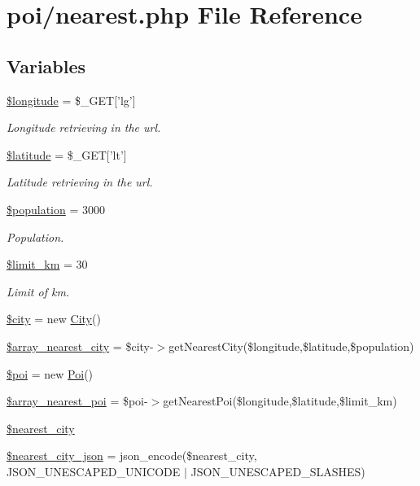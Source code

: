 \hypertarget{poi_2nearest_8php}{\section{poi/nearest.php File Reference}
\label{poi_2nearest_8php}
}
\subsection*{Variables}
\begin{DoxyCompactItemize}
\item 
\hyperlink{poi_2nearest_8php_aabb5b5c018fed3789fce382e336cfa47}{\$longitude} = \$\-\_\-\-G\-E\-T\mbox{[}'lg'\mbox{]}
\begin{DoxyCompactList}\small\item\em Longitude retrieving in the url. \end{DoxyCompactList}\item 
\hyperlink{poi_2nearest_8php_a5635a7326fb0b96e184ca6f5baa13e94}{\$latitude} = \$\-\_\-\-G\-E\-T\mbox{[}'lt'\mbox{]}
\begin{DoxyCompactList}\small\item\em Latitude retrieving in the url. \end{DoxyCompactList}\item 
\hyperlink{poi_2nearest_8php_afc1939ed7d0e8629546e2bc27b02dbc1}{\$population} = 3000
\begin{DoxyCompactList}\small\item\em Population. \end{DoxyCompactList}\item 
\hyperlink{poi_2nearest_8php_a00de150c5780d1d74512d2f6c6477d22}{\$limit\-\_\-km} = 30
\begin{DoxyCompactList}\small\item\em Limit of km. \end{DoxyCompactList}\item 
\hyperlink{poi_2nearest_8php_a5b9ddd3e3a69d8901270064346bdef49}{\$city} = new \hyperlink{class_city}{City}()
\item 
\hyperlink{poi_2nearest_8php_ad20bfb1568497d36431fbd90847417cc}{\$array\-\_\-nearest\-\_\-city} = \$city-\/$>$get\-Nearest\-City(\$longitude,\$latitude,\$population)
\item 
\hyperlink{poi_2nearest_8php_a15278c25ad2a899afd235d0093857e4c}{\$poi} = new \hyperlink{class_poi}{Poi}()
\item 
\hyperlink{poi_2nearest_8php_a0919b64d32b8806e2d59272d197f32e7}{\$array\-\_\-nearest\-\_\-poi} = \$poi-\/$>$get\-Nearest\-Poi(\$longitude,\$latitude,\$limit\-\_\-km)
\item 
\hyperlink{poi_2nearest_8php_abf6b27fab4f9b20ea05f510f3b597d52}{\$nearest\-\_\-city}
\item 
\hyperlink{poi_2nearest_8php_a0b142ae8ff992c1fff670c905b46e066}{\$nearest\-\_\-city\-\_\-json} = json\-\_\-encode(\$nearest\-\_\-city, J\-S\-O\-N\-\_\-\-U\-N\-E\-S\-C\-A\-P\-E\-D\-\_\-\-U\-N\-I\-C\-O\-D\-E $\vert$ J\-S\-O\-N\-\_\-\-U\-N\-E\-S\-C\-A\-P\-E\-D\-\_\-\-S\-L\-A\-S\-H\-E\-S)
\end{DoxyCompactItemize}


